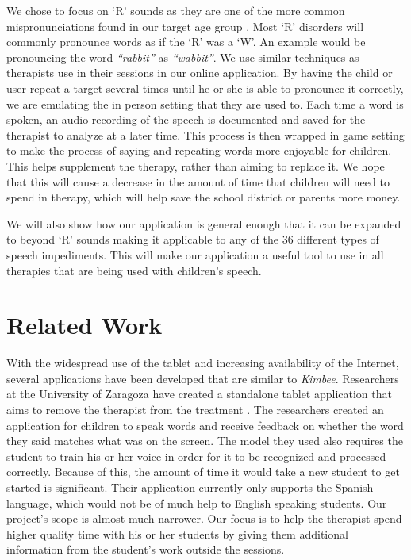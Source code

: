 \documentclass{sig-alternate-2013}
\begin{document}
We chose to focus on `R' sounds as they are one of the more common mispronunciations found in our target age group \cite{Dodd:Children}. Most `R' disorders will commonly pronounce words as if the `R' was a `W'. An example would be pronouncing the word {\em ``rabbit''} as {\em ``wabbit''}. We use similar techniques as therapists use in their sessions in our online application. By having the child or user repeat a target several times until he or she is able to pronounce it correctly, we are emulating the in person setting that they are used to. Each time a word is spoken, an audio recording of the speech is documented and saved for the therapist to analyze at a later time. This process is then wrapped in game setting to make the process of saying and repeating words more enjoyable for children. This helps supplement the therapy, rather than aiming to replace it. We hope that this will cause a decrease in the amount of time that children will need to spend in therapy, which will help save the school district or parents more money.

We will also show how our application is general enough that it can be expanded to beyond `R' sounds making it applicable to any of the 36 different types of speech impediments. This will make our application a useful tool to use in all therapies that are being used with children's speech.

\section{Related Work}
\label{sec:related}

With the widespread use of the tablet and increasing availability of the Internet, several applications have been developed that are similar to {\em Kimbee}. Researchers at the University of Zaragoza have created a standalone tablet application that aims to remove the therapist from the treatment \cite{Carlos:Vocaliza}. The researchers created an application for children to speak words and receive feedback on whether the word they said matches what was on the screen. The model they used also requires the student to train his or her voice in order for it to be recognized and processed correctly. Because of this, the amount of time it would take a new student to get started is significant. Their application currently only supports the Spanish language, which would not be of much help to English speaking students. Our project's scope is almost much narrower. Our focus is to help the therapist spend higher quality time with his or her students by giving them additional information from the student's work outside the sessions.
\end{document}
